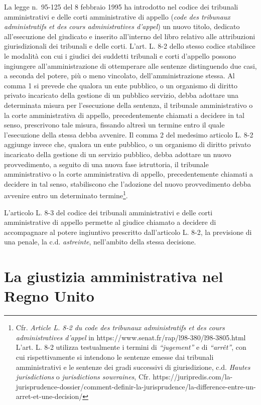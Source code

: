 \documentclass[12pt,it,a4paper,]{report}
\begin{document}
La legge n.~95-125 del 8 febbraio 1995 ha introdotto nel codice dei
tribunali amministrativi e delle corti amministrative di appello
(\emph{code des tribunaux administratifs et des cours administratives
d'appel}) un nuovo titolo, dedicato all'esecuzione del giudicato e
inserito all'interno del libro relativo alle attribuzioni
giurisdizionali dei tribunali e delle corti. L'art. L. 8-2 dello stesso
codice stabilisce le modalità con cui i giudici dei suddetti tribunali e
corti d'appello possono ingiungere all'amministrazione di ottemperare
alle sentenze distinguendo due casi, a seconda del potere, più o meno
vincolato, dell'amministrazione stessa. Al comma 1 si prevede che
qualora un ente pubblico, o un organismo di diritto privato incaricato
della gestione di un pubblico servizio, debba adottare una determinata
misura per l'esecuzione della sentenza, il tribunale amministrativo o la
corte amministrativa di appello, precedentemente chiamati a decidere in
tal senso, prescrivono tale misura, fissando altresì un termine entro il
quale l'esecuzione della stessa debba avvenire. Il comma 2 del medesimo
articolo L. 8-2 aggiunge invece che, qualora un ente pubblico, o un
organismo di diritto privato incaricato della gestione di un servizio
pubblico, debba adottare un nuovo provvedimento, a seguito di una nuova
fase istruttoria, il tribunale amministrativo o la corte amministrativa
di appello, precedentemente chiamati a decidere in tal senso,
stabiliscono che l'adozione del nuovo provvedimento debba avvenire entro
un determinato termine\footnote{Cfr. \emph{Article L. 8-2 du code des
  tribunaux administratifs et des cours administratives d'appel} in
  https://www.senat.fr/rap/l98-380/l98-3805.html L'art. L. 8-2 utilizza
  testualmente i termini di \emph{``jugement''} e di \emph{``arrêt''},
  con cui rispettivamente si intendono le sentenze emesse dai tribunali
  amministrativi e le sentenze dei gradi successivi di giurisdizione,
  c.d. \emph{Hautes jurisdictions} o \emph{jurisdictions souvraines},
  Cfr.
  https://juripredis.com/la-jurisprudence-dossier/comment-definir-la-jurisprudence/la-difference-entre-un-arret-et-une-decision/}.

L'articolo L. 8-3 del codice dei tribunali amministrativi e delle corti
amministrative di appello permette al giudice chiamato a decidere di
accompagnare al potere ingiuntivo prescritto dall'articolo L. 8-2, la
previsione di una penale, la c.d. \emph{astreinte}, nell'ambito della
stessa decisione.

\hypertarget{la-giustizia-amministrativa-nel-regno-unito}{%
\chapter{La giustizia amministrativa nel Regno
Unito}\label{la-giustizia-amministrativa-nel-regno-unito}}
\end{document}
